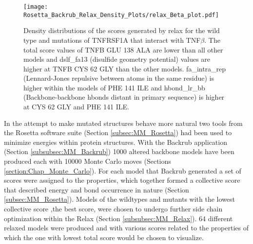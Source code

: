 	\newpage
		
	\begin{figure}[!ht]
		\centering
		\texttt{[image: Rosetta\_Backrub\_Relax\_Density\_Plots/relax\_Beta\_plot.pdf]}
		\caption[TNFRSF1A homotimer with TNF$\beta$ homotrimer relax score density plots]{Density distributions of the scores generated by relax for the wild type and mutations of TNFRSF1A that interact with TNF$\beta$. The total score values of TNFB GLU 138 ALA are lower than all other models and dslf\_fa13 (disulfide geometry potential) values are higher at TNFB CYS 62 GLY than the other models. fa\_intra\_rep (Lennard-Jones repulsive between atoms in the same residue) is higher within the models of PHE 141 ILE and hbond\_lr\_bb (Backbone-backbone hbonds distant in primary sequence) is higher at CYS 62 GLY and PHE 141 ILE.}
		\label{fig:relax_TNFB_scores}
	\end{figure}

	\newpage
	
	In the attempt to make mutated structures behave more natural two tools from the Rosetta software suite (Section \ref{subsec:MM_Rosetta}) had been used to minimize energies within protein structures. With the Backrub application (Section \ref{subsubsec:MM_Backrub}) 1000 altered backbone models have been produced each with 10000 Monte Carlo moves (Sections \ref{section:Chap_Monte_Carlo}). For each model that Backrub generated a set of scores were assigned to the properties, which together formed a collective score that described energy and bond occurrence in nature (Section \ref{subsec:MM_Rosetta}). Models of the wildtypes and mutants with the lowest collective score ,the best score, were chosen to undergo further side chain optimization within the Relax (Section \ref{subsubsec:MM_Relax}). 64 different relaxed models were produced and with various scores related to the properties of which the one with lowest total score would be chosen to visualize. 
	
